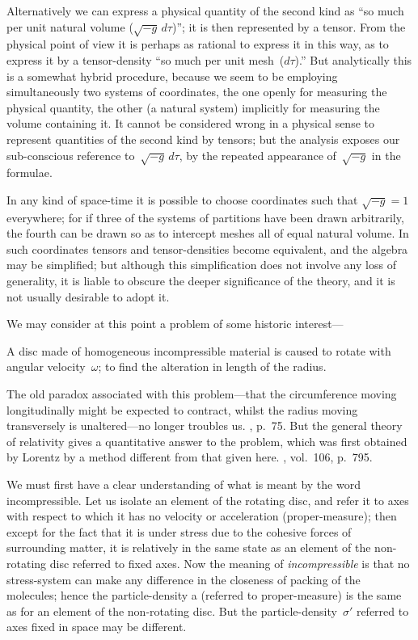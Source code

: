 \documentclass[12pt]{book}
\begin{document}
Alternatively we can express a physical quantity of the second kind as
``so much per unit natural volume ($\sqrt{-g}\, d\tau$)''; it is then represented by a
tensor. From the physical point of view it is perhaps as rational to express
it in this way, as to express it by a tensor-density ``so much per unit mesh~($d\tau$).''
But analytically this is a somewhat hybrid procedure, because we seem
to be employing simultaneously two systems of coordinates, the one openly
for measuring the physical quantity, the other (a natural system) implicitly
for measuring the volume containing it. It cannot be considered wrong in a
physical sense to represent quantities of the second kind by tensors; but the
analysis exposes our sub-conscious reference to~$\sqrt{-g}\, d\tau$, by the repeated
appearance of~$\sqrt{-g}$ in the formulae.

In any kind of space-time it is possible to choose coordinates such that
$\sqrt{-g} = 1$ everywhere; for if three of the systems of partitions have been
drawn arbitrarily, the fourth can be drawn so as to intercept meshes all of
equal natural volume. In such coordinates tensors and tensor-densities become
equivalent, and the algebra may be simplified; but although this simplification
does not involve any loss of generality, it is liable to obscure the deeper
significance of the theory, and it is not usually desirable to adopt it.

%
%

We may consider at this point a problem of some historic interest---

A disc made of homogeneous incompressible material is caused to rotate
with angular velocity~$\omega$; to find the alteration in length of the radius.

The old paradox associated with this problem---that the circumference
moving longitudinally might be expected to contract, whilst the radius moving
transversely is unaltered---no longer troubles us\footnotemark.\footnotetext
  {, p.~75.}
But the general theory of
relativity gives a quantitative answer to the problem, which was first obtained
by Lorentz by a method different from that given here\footnotemark.\footnotetext
  {, vol.~106, p.~795.}

We must first have a clear understanding of what is meant by the word
%
incompressible. Let us isolate an element of the rotating disc, and refer it to
axes with respect to which it has no velocity or acceleration (proper-measure);
then except for the fact that it is under stress due to the cohesive forces of
surrounding matter, it is relatively in the same state as an element of the
non-rotating disc referred to fixed axes. Now the meaning of \emph{incompressible}
is that no stress-system can make any difference in the closeness of packing
of the molecules; hence the particle-density a (referred to proper-measure)
is the same as for an element of the non-rotating disc. But the particle-density~$\sigma'$
referred to axes fixed in space may be different.
\end{document}
